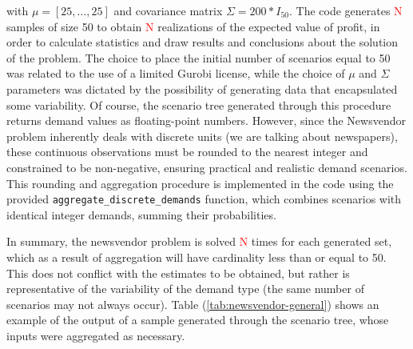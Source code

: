 \documentclass[a4paper,12pt]{article}
\begin{document}
	 with $\mu = [25,\dots,25]$ and covariance matrix $\Sigma = 200 * I_{50}$. The code generates \textcolor{red}{N} samples of size 50 to obtain \textcolor{red}{N} realizations of the expected value of profit, in order to calculate statistics and draw results and conclusions about the solution of the problem.
	 The choice to place the initial number of scenarios equal to 50 was related to the use of a limited Gurobi license, while the choice of $\mu$ and $\Sigma$ parameters was dictated by the possibility of generating data that encapsulated some variability.
	\noindent Of course, the scenario tree generated through this procedure returns demand values as floating-point numbers. However, since the Newsvendor problem inherently deals with discrete units (we are talking about newspapers), these continuous observations must be rounded to the nearest integer and constrained to be non-negative, ensuring practical and realistic demand scenarios. This rounding and aggregation procedure is implemented in the code using the provided \texttt{aggregate\_discrete\_demands} function, which combines scenarios with identical integer demands, summing their probabilities.
	
	\noindent In summary, the newsvendor problem is solved \textcolor{red}{N} times for each generated set, which as a result of aggregation will have cardinality less than or equal to 50. This does not conflict with the estimates to be obtained, but rather is representative of the variability of the demand type (the same number of scenarios may not always occur). Table (\ref{tab:newsvendor-general}) shows an example of the output of a sample generated through the scenario tree, whose inputs were aggregated as necessary.\\
	
\end{document}
